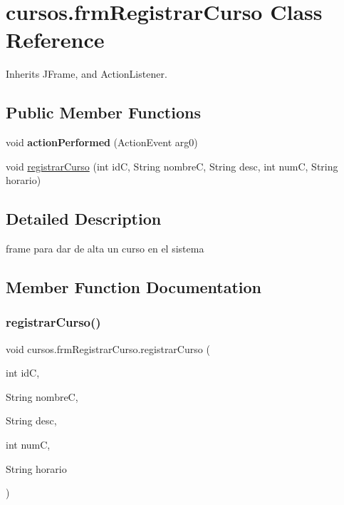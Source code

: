\hypertarget{classcursos_1_1frm_registrar_curso}{}\section{cursos.\+frm\+Registrar\+Curso Class Reference}
\label{classcursos_1_1frm_registrar_curso}


Inherits J\+Frame, and Action\+Listener.

\subsection*{Public Member Functions}
\begin{DoxyCompactItemize}
\item 
\mbox{\label{classcursos_1_1frm_registrar_curso_a40146efca991102f21d77f734e457ffd}} 
void {\bfseries action\+Performed} (Action\+Event arg0)
\item 
void \hyperlink{classcursos_1_1frm_registrar_curso_af6a8ffe199f6a7bbd053a66407d4e2d2}{registrar\+Curso} (int idC, String nombreC, String desc, int numC, String horario)
\end{DoxyCompactItemize}


\subsection{Detailed Description}
frame para dar de alta un curso en el sistema 

\subsection{Member Function Documentation}
\mbox{\label{classcursos_1_1frm_registrar_curso_af6a8ffe199f6a7bbd053a66407d4e2d2}} 
\subsubsection{\texorpdfstring{registrar\+Curso()}{registrarCurso()}}
{\footnotesize\ttfamily void cursos.\+frm\+Registrar\+Curso.\+registrar\+Curso (\begin{DoxyParamCaption}\item[{int}]{idC,  }\item[{String}]{nombreC,  }\item[{String}]{desc,  }\item[{int}]{numC,  }\item[{String}]{horario }\end{DoxyParamCaption})}

